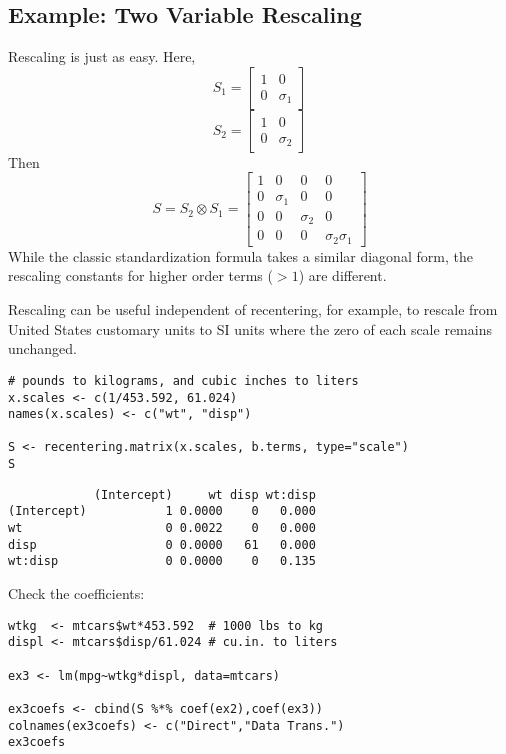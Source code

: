 \documentclass[]{article}
\begin{document}
\hypertarget{example-two-variable-rescaling}{%
\subsection{Example: Two Variable
Rescaling}\label{example-two-variable-rescaling}}

Rescaling is just as easy. Here,
\[S_1=\begin{bmatrix}1 &0 \\ 0 &\sigma_1 \end{bmatrix}\]
\[S_2=\begin{bmatrix}1 &0 \\ 0 &\sigma_2 \end{bmatrix}\] Then
\[S = S_2 \otimes S_1 = \begin{bmatrix} 1 &0 &0 &0 \\
  0 &\sigma_1 &0 &0 \\ 0 &0 &\sigma_2 &0 \\ 0 &0 &0 &\sigma_2\sigma_1 \end{bmatrix}\]
While the classic standardization formula takes a similar diagonal form,
the rescaling constants for higher order terms (\(>1\)) are different.

Rescaling can be useful independent of recentering, for example, to
rescale from United States customary units to SI units where the zero of
each scale remains unchanged.

\begin{verbatim}
# pounds to kilograms, and cubic inches to liters
x.scales <- c(1/453.592, 61.024)
names(x.scales) <- c("wt", "disp")
  
S <- recentering.matrix(x.scales, b.terms, type="scale")
S
\end{verbatim}

\begin{verbatim}
            (Intercept)     wt disp wt:disp
(Intercept)           1 0.0000    0   0.000
wt                    0 0.0022    0   0.000
disp                  0 0.0000   61   0.000
wt:disp               0 0.0000    0   0.135
\end{verbatim}

Check the coefficients:

\begin{verbatim}
wtkg  <- mtcars$wt*453.592  # 1000 lbs to kg
displ <- mtcars$disp/61.024 # cu.in. to liters

ex3 <- lm(mpg~wtkg*displ, data=mtcars)

ex3coefs <- cbind(S %*% coef(ex2),coef(ex3))
colnames(ex3coefs) <- c("Direct","Data Trans.")
ex3coefs
\end{verbatim}
\end{document}
